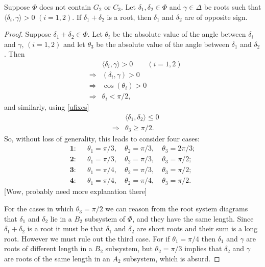 \begin{lemma} \label{uabelian}
Suppose $\Phi$ does not contain $G_2$ or $C_3$. Let $\delta_1, \delta_2 \in \Phi$ and $\gamma \in \Delta$ be roots such that $\langle \delta_i, \gamma \rangle > 0$ $(i = 1, 2)$. If $\delta_1 + \delta_2$ is a root, then $\delta_1$ and $\delta_2$ are of opposite sign.
\end{lemma}
\begin{proof}
Suppose $\delta_1 + \delta_2 \in \Phi$. Let $\theta_i$ be the absolute value of the angle between $\delta_i$ and $\gamma$, $(i = 1,2)$ and let $\theta_3$ be the absolute value of the angle between $\delta_1$ and $\delta_2$. Then
\begin{eqnarray*}
&& \langle \delta_i, \gamma\rangle > 0 \qquad (i=1,2) \\
& \Longrightarrow& (\delta_i, \gamma) > 0 \\
& \Longrightarrow& \cos(\theta_i) > 0 \\
& \Longrightarrow& \theta_i < \pi/2,
\end{eqnarray*}
and similarly, using \ref{ufixes}
\begin{eqnarray*}
&& \langle \delta_1, \delta_2 \rangle \leq 0 \\
& \Longrightarrow& \theta_3 \geq \pi/2.
\end{eqnarray*}
So, without loss of generality, this leads to consider four cases:
\begin{eqnarray*}
\textbf{1:}&&\theta_1 = \pi/3,\quad\theta_2 = \pi/3,\quad\theta_3 = 2\pi/3; \\
\textbf{2:}&&\theta_1 = \pi/3,\quad\theta_2 = \pi/3,\quad\theta_3 = \pi/2; \\
\textbf{3:}&&\theta_1 = \pi/4,\quad\theta_2 = \pi/3,\quad\theta_3 = \pi/2; \\
\textbf{4:}&&\theta_1 = \pi/4,\quad\theta_2 = \pi/4,\quad\theta_3 = \pi/2.
\end{eqnarray*}
[Wow, probably need more explanation there] 

For the cases in which $\theta_3 = \pi/2$ we can reason from the root system diagrams that $\delta_1$ and $\delta_2$ lie in a $B_2$ subsystem of $\Phi$, and they have the same length. Since $\delta_1+\delta_2$ is a root it must be that $\delta_1$ and $\delta_2$ are short roots and their sum is a long root. However we must rule out the third case. For if $\theta_1 = \pi/4$ then $\delta_1$ and $\gamma$ are roots of different length in a $B_2$ subsystem, but $\theta_2 = \pi/3$ implies that $\delta_2$ and $\gamma$ are roots of the same length in an $A_2$ subsystem, which is absurd.


\end{proof}
